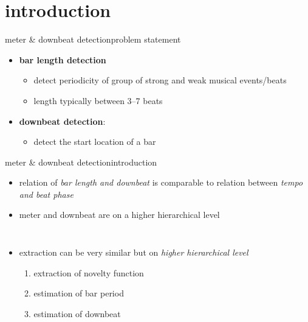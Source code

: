     \section[intro]{introduction}
        \begin{frame}{meter \& downbeat detection}{problem statement}
            \begin{itemize}
                \item \textbf{bar length detection}
                    \begin{itemize}
                        \item   detect periodicity of group of strong and weak musical events/beats
                        \item   length typically between 3--7 beats
                    \end{itemize}
                \bigskip
                \item   \textbf{downbeat detection}:
                    \begin{itemize}
                        \item   detect the start location of a bar
                    \end{itemize}
            \end{itemize}
        \end{frame}
        
            \begin{frame}{meter \& downbeat detection}{introduction}
                \begin{itemize}
                    \item   relation of \textit{bar length and downbeat} is comparable to relation between \textit{tempo and beat phase}
                    \item   meter and downbeat are on a higher hierarchical level
                \end{itemize}
                \begin{columns}
                \begin{itemize}
                    \item<2-> extraction can be very similar but on \textit{higher hierarchical level}
                        \begin{enumerate}
                            \item   extraction of novelty function
                            \item   estimation of bar period
                            \item   estimation of downbeat
                        \end{enumerate}
                \end{itemize}
                    \vspace{-10mm}
                \end{columns}
            \end{frame}

